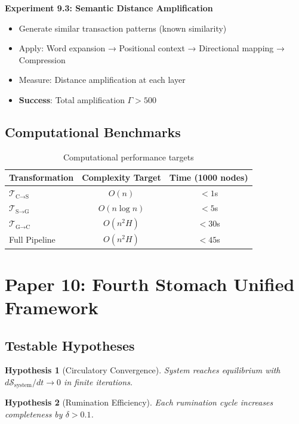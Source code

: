 \documentclass[12pt]{article}
\newtheorem{hypothesis}{Hypothesis}
\begin{document}
\textbf{Experiment 9.3: Semantic Distance Amplification}
\begin{itemize}
    \item Generate similar transaction patterns (known similarity)
    \item Apply: Word expansion → Positional context → Directional mapping → Compression
    \item Measure: Distance amplification at each layer
    \item \textbf{Success}: Total amplification $\Gamma > 500$
\end{itemize}

\subsection{Computational Benchmarks}

\begin{table}[h]
\centering
\begin{tabular}{|l|c|c|}
\hline
Transformation & Complexity Target & Time (1000 nodes) \\
\hline
$\mathcal{T}_{\text{C→S}}$ & $O(n)$ & $< 1$s \\
$\mathcal{T}_{\text{S→G}}$ & $O(n \log n)$ & $< 5$s \\
$\mathcal{T}_{\text{G→C}}$ & $O(n^2 H)$ & $< 30$s \\
Full Pipeline & $O(n^2 H)$ & $< 45$s \\
\hline
\end{tabular}
\caption{Computational performance targets}
\end{table}

\section{Paper 10: Fourth Stomach Unified Framework}

\subsection{Testable Hypotheses}

\begin{hypothesis}[Circulatory Convergence]
System reaches equilibrium with $d\mathcal{S}_{\text{system}}/dt \to 0$ in finite iterations.
\end{hypothesis}

\begin{hypothesis}[Rumination Efficiency]
Each rumination cycle increases completeness by $\delta > 0.1$.
\end{hypothesis}
\end{document}
